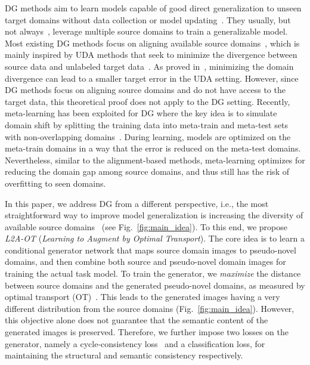 \documentclass[runningheads]{llncs}
\begin{document}
DG methods aim to learn models capable of good direct generalization to unseen target domains without data collection or model updating~\cite{muandet2013domain}. They usually, but not always~\cite{volpi2018generalizing}, leverage multiple source domains to train a generalizable model. Most existing DG methods focus on aligning available source domains~\cite{motiian2017unified,ghifary2017scatter,gan2016learning,ghifary2015domain,li2018ciddg,li2018mmdaae}, which is mainly inspired by UDA methods that seek to minimize the divergence between source data and unlabeled target data~\cite{ganin2016domain,tzeng2017adversarial}. As proved in~\cite{ben2010theory}, minimizing the domain divergence can lead to a smaller target error in the UDA setting. However, since DG methods focus on aligning source domains and do not have access to the target data, this theoretical proof does not apply to the DG setting. Recently, meta-learning has been exploited for DG where the key idea is to simulate domain shift by splitting the training data into meta-train and meta-test sets with non-overlapping domains~\cite{li2018learning,balaji2018metareg,feature_critic,li2019episodic,dou2019domain}. During learning, models are optimized on the meta-train domains in a way that the error is reduced on the meta-test domains. Nevertheless, similar to the alignment-based methods, meta-learning optimizes for reducing the domain gap among source domains, and thus still has the risk of overfitting to seen domains.

In this paper, we address DG from a different perspective, i.e., the most straightforward way to improve model generalization is increasing the diversity of available source domains~\cite{DomainRandomization} (see Fig.~\ref{fig:main_idea}). To this end, we propose \emph{L2A-OT} (\emph{Learning to Augment by Optimal Transport}). The core idea is to learn a conditional generator network that maps source domain images to pseudo-novel domains, and then combine both source and pseudo-novel domain images for training the actual task model. To train the generator, we \emph{maximize} the distance between source domains and the generated pseudo-novel domains, as measured by optimal transport (OT)~\cite{peyre2019computational}. This leads to the generated images having a very different distribution from the source domains (Fig.~\ref{fig:main_idea}). However, this objective alone does not guarantee that the semantic content of the generated images is preserved. Therefore, we further impose two losses on the generator, namely a cycle-consistency loss~\cite{CycleGAN} and a classification loss, for maintaining the structural and semantic consistency respectively.
\end{document}
